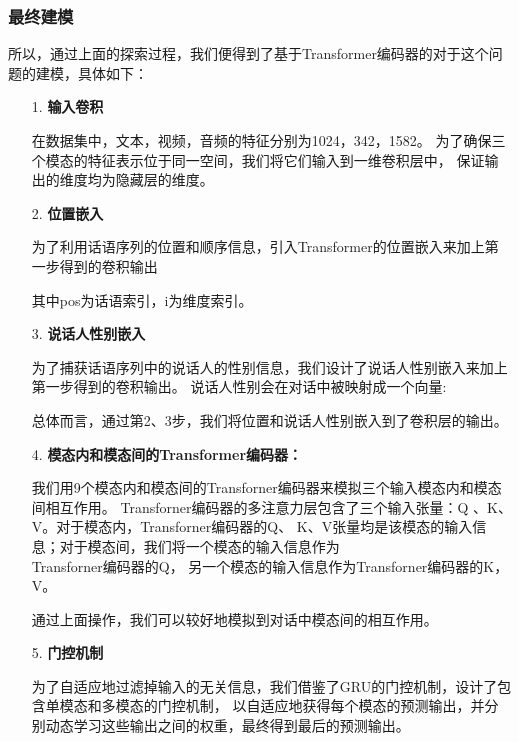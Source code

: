 \documentclass[11pt]{article}
\begin{document}
            \subsubsection{最终建模}
            所以，通过上面的探索过程，我们便得到了基于Transformer编码器的对于这个问题的建模，具体如下：
            \begin{enumerate}
                \setlength{\parindent}{2em}

                \item [1. ]\textbf{输入卷积}
                \par 在数据集中，文本，视频，音频的特征分别为1024，342，1582。
                为了确保三个模态的特征表示位于同一空间，我们将它们输入到一维卷积层中，
                保证输出的维度均为隐藏层的维度。
                
                \item [2. ]\textbf{位置嵌入}\par
                为了利用话语序列的位置和顺序信息，引入Transformer的位置嵌入来加上第一步得到的卷积输出

                其中pos为话语索引，i为维度索引。
                
                \item [3. ]\textbf{说话人性别嵌入}\par
                为了捕获话语序列中的说话人的性别信息，我们设计了说话人性别嵌入来加上第一步得到的卷积输出。
                说话人性别会在对话中被映射成一个向量:
                
                总体而言，通过第2、3步，我们将位置和说话人性别嵌入到了卷积层的输出。
                
                \item [4. ]\textbf{模态内和模态间的Transformer编码器：}\par
                我们用9个模态内和模态间的Transforner编码器来模拟三个输入模态内和模态间相互作用。
                Transforner编码器的多注意力层包含了三个输入张量：Q 、K、 V。对于模态内，Transforner编码器的Q、
                K、V张量均是该模态的输入信息；对于模态间，我们将一个模态的输入信息作为\\Transforner编码器的Q，
                另一个模态的输入信息作为Transforner编码器的K，V。

                通过上面操作，我们可以较好地模拟到对话中模态间的相互作用。
                
                \item [5. ]\textbf{门控机制}\par
                为了自适应地过滤掉输入的无关信息，我们借鉴了GRU的门控机制，设计了包含单模态和多模态的门控机制，
                以自适应地获得每个模态的预测输出，并分别动态学习这些输出之间的权重，最终得到最后的预测输出。
                

\end{enumerate}
\end{document}
